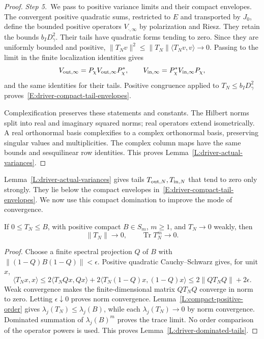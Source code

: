 \begin{proof}
  \medskip
  \noindent\textit{Step 5.~}We pass to positive variance limits and their
  compact envelopes.
  The convergent positive quadratic sums, restricted to $E$ and transported by
  $J_0$, define the bounded positive operators $V_{\cdot,\infty}$ by
  polarization and Riesz. They retain the bounds $b_ID_\gamma^2$. Their tails
  have quadratic forms tending to zero. Since they are uniformly bounded and
  positive, $\|T_Nv\|^2 \le \|T_N\|\langle T_Nv,v\rangle \to 0$. Passing to the
  limit in the finite localization identities gives
  \[
    V_{{\rm out},\infty}=P_\chi V_{{\rm out},\infty}P_\chi^*,\qquad
    V_{{\rm in},\infty}=P_\chi^*V_{{\rm in},\infty}P_\chi,
  \]
  and the same identities for their tails. Positive congruence applied to $T_N
  \le b_ID_\gamma^2$ proves~\eqref{E:driver-compact-tail-envelopes}.

  Complexification preserves these statements and constants. The Hilbert norms
  split into real and imaginary squared norms; real operators extend
  isometrically. A real orthonormal basis complexifies to a complex orthonormal
  basis, preserving singular values and multiplicities. The complex column maps
  have the same bounds and sesquilinear row identities. This proves
  Lemma~\ref{L:driver-actual-variances}.
\end{proof}

Lemma~\ref{L:driver-actual-variances} gives tails
$T_{{\rm out},N},T_{{\rm in},N}$ that tend to zero only strongly. They lie
below the compact envelopes in~\eqref{E:driver-compact-tail-envelopes}. We
now use this compact domination to improve the mode of convergence.

\begin{lemma}\label{L:driver-dominated-tails}
  If $0 \le T_N \le B$, with positive compact $B \in S_m$, $m \ge 1$, and $T_N
  \to 0$ weakly, then
  \begin{equation}\label{E:driver-trace-tails}
    \|T_N\|\longrightarrow0,\qquad \operatorname{Tr}T_N^m\longrightarrow0.
  \end{equation}
\end{lemma}

\begin{proof}
  Choose a finite spectral projection $Q$ of $B$ with $\|(1-Q)B(1-Q)\| <
  \epsilon$. Positive quadratic Cauchy--Schwarz gives, for unit $x$,
  \[
    \langle T_Nx,x\rangle
    \le2\langle T_NQx,Qx\rangle
    +2\langle T_N(1-Q)x,(1-Q)x\rangle
    \le2\|QT_NQ\|+2\epsilon.
  \]
  Weak convergence makes the finite-dimensional matrix $QT_NQ$ converge in norm
  to zero. Letting $\epsilon\downarrow0$ proves norm convergence.
  Lemma~\ref{L:compact-positive-order} gives $\lambda_j(T_N) \le \lambda_j(B)$,
  while each $\lambda_j(T_N) \to 0$ by norm convergence. Dominated summation of
  $\lambda_j(B)^m$ proves the trace limit. No order comparison of the operator
  powers is used. This proves Lemma~\ref{L:driver-dominated-tails}.
\end{proof}

